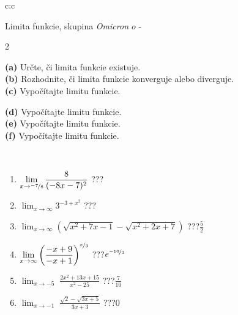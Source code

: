 \documentclass[10pt]{report}
\newcommand\omicron{o}
\begin{document}
\thispagestyle{empty}
\begin{tabular}{c:c}
\begin{minipage}[c][104.5mm][t]{0.5\linewidth}
\begin{center}
\vspace{7mm}
{\huge Limita funkcie, skupina \textit{Omicron $\omicron$} -}\\[5mm]
\begin{minipage}{0.95\linewidth}
\begin{center}
{\small \begin{multicols}{2} \raggedright
\textbf{(a)} Určte, či limita funkcie existuje. \\[1mm]
\textbf{(b)} Rozhodnite, či limita funkcie konverguje alebo diverguje. \\[1mm]
\textbf{(c)} Vypočítajte limitu funkcie. \par \columnbreak
\textbf{(d)} Vypočítajte limitu funkcie. \\[1mm]
\textbf{(e)} Vypočítajte limitu funkcie. \\[1mm]
\textbf{(f)} Vypočítajte limitu funkcie. \\[1mm]
\end{multicols}
}
\end{center}
\end{minipage}
\\[4mm]
\begin{minipage}{0.79\linewidth}
\begin{center}
\begin{varwidth}{\linewidth}
\begin{enumerate}
\normalsize
\item $\displaystyle\lim_{x\to\nicefrac{-7}{8}}{\frac{8}{(-8x-7)^{2}}}$\quad \dotfill\; ???\;\dotfill \quad {}
\item $\displaystyle\lim_{x\to\infty}{3^{-3+x^2}}$\quad \dotfill\; ???\;\dotfill \quad {}
\item $\displaystyle\lim_{x\to\infty}{\left(\sqrt{x^2+7x-1} - \sqrt{x^2+2x+7}\right)}$\quad \dotfill\; ???\;\dotfill \quad $\frac{5}{2}$
\item $\displaystyle\lim_{x\to\infty}{\left( \frac{-x+9}{-x+1} \right)^{\nicefrac{x}{3}}}$\quad \dotfill\; ???\;\dotfill \quad $e^{\nicefrac{-10}{3}}$
\item $\displaystyle\lim_{x\to -5}{\;\frac{2x^2+13x+15}{x^2-25}}$\quad \dotfill\; ???\;\dotfill \quad $\frac{7}{10}$
\item $\displaystyle\lim_{x\to -1}{\;\frac{\sqrt{2}-\sqrt{3x+5}}{3x+3}}$\quad \dotfill\; ???\;\dotfill \quad $0$

\end{enumerate}
\end{varwidth}
\end{center}
\end{minipage}
\end{center}
\end{minipage}
\end{tabular}
\end{document}
